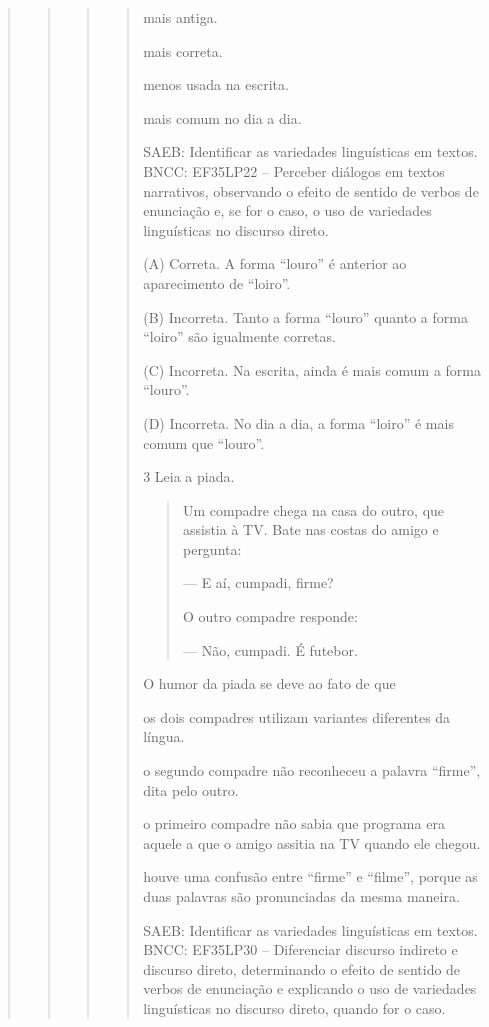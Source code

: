 \begin{boxlist}
{{\begin{quote}
\begin{quote}
\begin{quote}
{\begin{quote}
\begin{escolha}
\item mais antiga.
\item mais correta.
\item menos usada na escrita.
\item mais comum no dia a dia.
\end{escolha}

SAEB: Identificar as variedades linguísticas em textos.
BNCC: EF35LP22 -- Perceber diálogos em textos narrativos, observando o
efeito de sentido de verbos de enunciação e, se for o caso, o uso de
variedades linguísticas no discurso direto.

(A) Correta. A forma ``louro'' é anterior ao aparecimento de ``loiro''.

(B) Incorreta. Tanto a forma ``louro'' quanto a forma ``loiro'' são igualmente corretas.

(C) Incorreta. Na escrita, ainda é mais comum a forma ``louro''.

(D) Incorreta. No dia a dia, a forma ``loiro'' é mais comum que ``louro''.

\num{3} Leia a piada.

\begin{quote}
Um compadre chega na casa do outro, que assistia à TV. Bate nas costas do amigo e pergunta:

--- E aí, cumpadi, firme?

O outro compadre responde:

--- Não, cumpadi. É futebor.

\end{quote}

O humor da piada se deve ao fato de que

\begin{escolha}
\item os dois compadres utilizam variantes diferentes da língua.
\item o segundo compadre não reconheceu a palavra ``firme'', dita pelo outro.
\item o primeiro compadre não sabia que programa era aquele a que o amigo assitia na TV quando ele chegou.
\item houve uma confusão entre ``firme'' e ``filme'', porque as duas palavras são pronunciadas da mesma maneira.
\end{escolha}

SAEB: Identificar as variedades linguísticas em textos.
BNCC: EF35LP30 -- Diferenciar discurso indireto e discurso direto,
determinando o efeito de sentido de verbos de enunciação e explicando o
uso de variedades linguísticas no discurso direto, quando for o caso.


\end{quote}}
\end{quote}
\end{quote}
\end{quote}}}
\end{boxlist}
